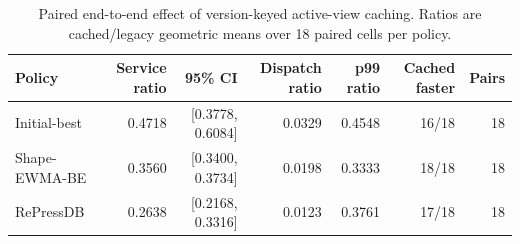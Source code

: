 \begin{table}[t]
\centering
\caption{Paired end-to-end effect of version-keyed active-view caching. Ratios are cached/legacy geometric means over 18 paired cells per policy.}
\label{tab:e2e_cache}
\begin{tabular}{@{}lrrrrrr@{}}
\toprule
Policy & Service ratio & 95\% CI & Dispatch ratio & p99 ratio & Cached faster & Pairs \\
\midrule
Initial-best & 0.4718 & [0.3778, 0.6084] & 0.0329 & 0.4548 & 16/18 & 18 \\
Shape-EWMA-BE & 0.3560 & [0.3400, 0.3734] & 0.0198 & 0.3333 & 18/18 & 18 \\
RePressDB & 0.2638 & [0.2168, 0.3316] & 0.0123 & 0.3761 & 17/18 & 18 \\
\bottomrule
\end{tabular}
\end{table}
